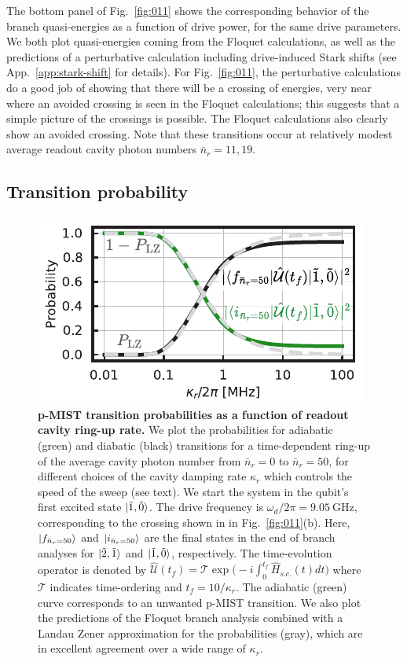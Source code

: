 \documentclass[%
reprint,
superscriptaddress,
 amsmath,amssymb,
 aps,
 prx,
longbibliography,
floatfix,
]{revtex4-2}
\begin{document}
The bottom panel of Fig.~\ref{fig:011} shows the corresponding behavior of the branch quasi-energies as a function of drive power, for the same drive parameters.  We both plot quasi-energies coming from the Floquet calculations, as well as the predictions of a perturbative calculation including drive-induced Stark shifts (see App.~\ref{app:stark-shift} for details). For Fig.~\ref{fig:011}, the perturbative calculations do a good job of showing that there will be a crossing of energies, very near where an avoided crossing is seen in the Floquet calculations; this suggests that a simple picture of the crossings is possible. The Floquet calculations also clearly show an avoided crossing. Note that these transitions occur at relatively modest average readout cavity photon numbers $\bar n_r=11,19$. 


\subsection{Transition probability}\label{sec:LZ}
\begin{figure}[t]
    \centering
    \includegraphics[width=\linewidth]{Figures/LZ.pdf}
    \caption{
    {\bf p-MIST transition probabilities as a function of readout cavity ring-up rate.}
    We plot the probabilities for adiabatic (green) and diabatic (black) transitions for a time-dependent ring-up of the average cavity photon number from $\bar{n}_r = 0$ to $\bar{n}_r = 50$, for different choices of the cavity damping rate $\kappa_r$ which controls the speed of the sweep (see text).  We start the system in the qubit's first excited state $\ket{\tilde{1},\tilde{0}}$.  The drive frequency is $\omega_d/2\pi=9.05 \ \mathrm{GHz}$, corresponding to the crossing shown in in Fig.~\ref{fig:011}(b).
    Here, $\ket{f_{\bar n_r=50}}$ and $\ket{i_{\bar n_r=50}}$ are the final states in the end of branch analyses for $\ket{\tilde{2},\tilde{1}}$ and $\ket{\tilde{1},\tilde{0}}$, respectively. The time-evolution operator is denoted by $ \hat{\mathcal{U}}(t_f)=\mathcal{T}\exp\big(-i\int^{t_f}_{0} \hat H_{s.c.}(t)dt\big)$ where $\mathcal{T}$ indicates time-ordering and $t_f=10/\kappa_r$. The adiabatic (green) curve corresponds to an unwanted p-MIST transition.  We also plot the predictions of the Floquet branch analysis combined with a Landau Zener approximation for the probabilities (gray), which are in excellent agreement over a wide range of $\kappa_r$.}
    \label{fig:LZ}
\end{figure}
\end{document}
